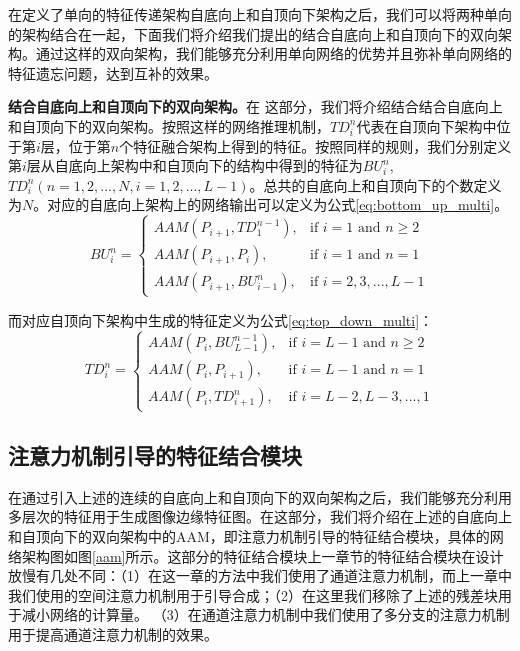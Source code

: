 \documentclass[master]{thesis-uestc}
\begin{document}
{在定义了单向的特征传递架构自底向上和自顶向下架构之后，我们可以将两种单向的架构结合在一起，下面我们将介绍我们提出的结合自底向上和自顶向下的双向架构。通过这样的双向架构，我们能够充分利用单向网络的优势并且弥补单向网络的特征遗忘问题，达到互补的效果。

\textbf{结合自底向上和自顶向下的双向架构。}在 这部分，我们将介绍结合结合自底向上和自顶向下的双向架构。按照这样的网络推理机制，$TD_{i}^{n}$代表在自顶向下架构中位于第$i$层，位于第$n$个特征融合架构上得到的特征。按照同样的规则，我们分别定义第$i$层从自底向上架构中和自顶向下的结构中得到的特征为$BU_{i}^{n}$, $TD_{i}^{n} (n=1,2,...,N, i=1,2,...,L-1)$。总共的自底向上和自顶向下的个数定义为$N$。对应的自底向上架构上的网络输出可以定义为公式\eqref{eq:bottom_up_multi}。
\begin{equation}
    BU_i^n \!\!=\!\!
    \begin{cases}
    AAM(P_{i+1}, TD_1^{n-1}),\!\! &\text{if $i = 1$ and $n \geq 2$} \\
    AAM(P_{i+1}, P_{i}),\!\! &\text{if $i = 1$ and $n = 1$} \\
    AAM(P_{i+1}, BU_{i-1}^{n}),\!\! &\text{if $i = 2,3,...,L-1$}
    \end{cases}
    \label{eq:bottom_up_multi}
 \end{equation}

而对应自顶向下架构中生成的特征定义为公式\eqref{eq:top_down_multi}：
\begin{equation}
    TD_i^n \!=\!\!
    \begin{cases}
     {AAM}(P_i, BU_{L-1}^{n-1}),\!  &\text{if $i\! = \!L\!-\!1$ and $n \geq 2$}\\
     {AAM}(P_i, P_{i+1}), \! &\text{if $i \!=\! L\!-\!1$ and $n = 1$}\\
     {AAM}(P_i, TD_{i+1}^{n}), \!&\text{if $i \!=\! L\!-\!2, L\!-\!3,...,1$}
    \end{cases}
    \label{eq:top_down_multi}
\end{equation}
 
\subsection{注意力机制引导的特征结合模块}

在通过引入上述的连续的自底向上和自顶向下的双向架构之后，我们能够充分利用多层次的特征用于生成图像边缘特征图。在这部分，我们将介绍在上述的自底向上和自顶向下的双向架构中的AAM，即注意力机制引导的特征结合模块，具体的网络架构图如图\ref{aam}所示。这部分的特征结合模块上一章节的特征结合模块在设计放慢有几处不同：（1）在这一章的方法中我们使用了通道注意力机制，而上一章中我们使用的空间注意力机制用于引导合成；（2）在这里我们移除了上述的残差块用于减小网络的计算量。 （3）在通道注意力机制中我们使用了多分支的注意力机制用于提高通道注意力机制的效果。

}
\end{document}
